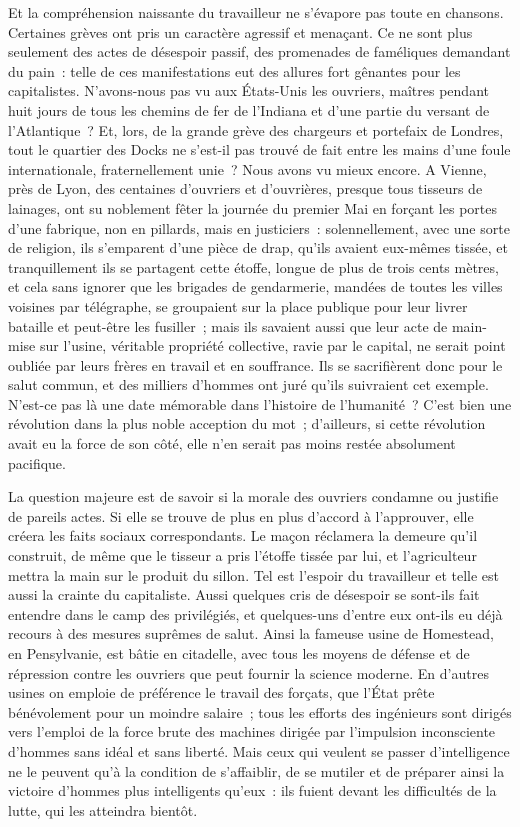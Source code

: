 \documentclass[french,twoside]{book} %
\begin{document}
\noindent Et la compréhension naissante du travailleur ne s’évapore pas toute en chansons. Certaines grèves ont pris un caractère agressif et menaçant. Ce ne sont plus seulement des actes de désespoir passif, des promenades de faméliques demandant du pain : telle de ces manifestations eut des allures fort gênantes pour les capitalistes. N’avons-nous pas vu aux États-Unis les ouvriers, maîtres pendant huit jours de tous les chemins de fer de l’Indiana et d’une partie du versant de l’Atlantique ? Et, lors, de la grande grève des chargeurs et portefaix de Londres, tout le quartier des Docks ne s’est-il pas trouvé de fait  entre les mains d’une foule internationale, fraternellement unie ? Nous avons vu mieux encore. A Vienne, près de Lyon, des centaines d’ouvriers et d’ouvrières, presque tous tisseurs de lainages, ont su noblement fêter la journée du premier Mai en forçant les portes d’une fabrique, non en pillards, mais en justiciers : solennellement, avec une sorte de religion, ils s’emparent d’une pièce de drap, qu’ils avaient eux-mêmes tissée, et tranquillement ils se partagent cette étoffe, longue de plus de trois cents mètres, et cela sans ignorer que les brigades de gendarmerie, mandées de toutes les villes voisines par télégraphe, se groupaient sur la place publique pour leur livrer bataille et peut-être les fusiller ; mais ils savaient aussi que leur  acte de main-mise sur l’usine, véritable propriété collective, ravie par le capital, ne serait point oubliée par leurs frères en travail et en souffrance. Ils se sacrifièrent donc pour le salut commun, et des milliers d’hommes ont juré qu’ils suivraient cet exemple. N’est-ce pas là une date mémorable dans l’histoire de l’humanité ? C’est bien une révolution dans la plus noble acception du mot ; d’ailleurs, si cette révolution avait eu la force de son côté, elle n’en serait pas moins restée absolument pacifique.\par
La question majeure est de savoir si la morale des ouvriers condamne ou justifie de pareils actes. Si elle se trouve de plus en plus d’accord à l’approuver, elle créera les faits sociaux correspondants. Le maçon réclamera la demeure  qu’il construit, de même que le tisseur a pris l’étoffe tissée par lui, et l’agriculteur mettra la main sur le produit du sillon. Tel est l’espoir du travailleur et telle est aussi la crainte du capitaliste. Aussi quelques cris de désespoir se sont-ils fait entendre dans le camp des privilégiés, et quelques-uns d’entre eux ont-ils eu déjà recours à des mesures suprêmes de salut. Ainsi la fameuse usine de Homestead, en Pensylvanie, est bâtie en citadelle, avec tous les moyens de défense et de répression contre les ouvriers que peut fournir la science moderne. En d’autres usines on emploie de préférence le travail des forçats, que l’État prête bénévolement pour un moindre salaire ; tous les efforts des ingénieurs sont dirigés vers l’emploi de  la force brute des machines dirigée par l’impulsion inconsciente d’hommes sans idéal et sans liberté. Mais ceux qui veulent se passer d’intelligence ne le peuvent qu’à la condition de s’affaiblir, de se mutiler et de préparer ainsi la victoire d’hommes plus intelligents qu’eux : ils fuient devant les difficultés de la lutte, qui les atteindra bientôt.\par
\end{document}
